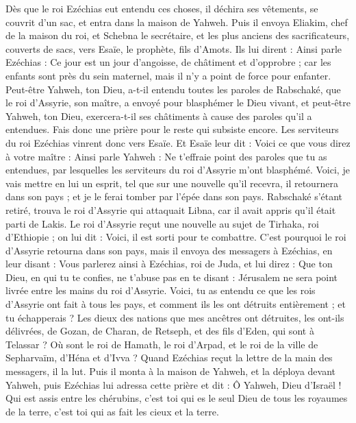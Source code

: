\begin{multicols}{2}
\VerseOne{}Dès que le roi Ezéchias eut entendu ces choses, il déchira ses vêtements, se couvrit d’un sac, et entra dans la maison de Yahweh.
Puis il envoya Eliakim, chef de la maison du roi, et Schebna le secrétaire, et les plus anciens des sacrificateurs, couverts de sacs, vers Esaïe, le prophète, fils d’Amots.
Ils lui dirent : Ainsi parle Ezéchias : Ce jour est un jour d’angoisse, de châtiment et d’opprobre ; car les enfants sont près du sein maternel, mais il n’y a point de force pour enfanter.
Peut-être Yahweh, ton Dieu, a-t-il entendu toutes les paroles de Rabschaké, que le roi d’Assyrie, son maître, a envoyé pour blasphémer le Dieu vivant, et peut-être Yahweh, ton Dieu, exercera-t-il ses châtiments à cause des paroles qu’il a entendues. Fais donc une prière pour le reste qui subsiste encore.
Les serviteurs du roi Ezéchias vinrent donc vers Esaïe.
Et Esaïe leur dit : Voici ce que vous direz à votre maître : Ainsi parle Yahweh : Ne t’effraie point des paroles que tu as entendues, par lesquelles les serviteurs du roi d’Assyrie m’ont blasphémé.
Voici, je vais mettre en lui un esprit, tel que sur une nouvelle qu’il recevra, il retournera dans son pays ; et je le ferai tomber par l’épée dans son pays.
Rabschaké s’étant retiré, trouva le roi d’Assyrie qui attaquait Libna, car il avait appris qu’il était parti de Lakis.
Le roi d’Assyrie reçut une nouvelle au sujet de Tirhaka, roi d’Ethiopie ; on lui dit : Voici, il est sorti pour te combattre. C’est pourquoi le roi d’Assyrie retourna dans son pays, mais il envoya des messagers à Ezéchias, en leur disant :
Vous parlerez ainsi à Ezéchias, roi de Juda, et lui direz : Que ton Dieu, en qui tu te confies, ne t’abuse pas en te disant : Jérusalem ne sera point livrée entre les mains du roi d’Assyrie.
Voici, tu as entendu ce que les rois d’Assyrie ont fait à tous les pays, et comment ils les ont détruits entièrement ; et tu échapperais ?
Les dieux des nations que mes ancêtres ont détruites, les ont-ils délivrées, de Gozan, de Charan, de Retseph, et des fils d’Eden, qui sont à Telassar ?
Où sont le roi de Hamath, le roi d’Arpad, et le roi de la ville de Sepharvaïm, d’Héna et d’Ivva ?
Quand Ezéchias reçut la lettre de la main des messagers, il la lut. Puis il monta à la maison de Yahweh, et la déploya devant Yahweh,
puis Ezéchias lui adressa cette prière et dit : Ô Yahweh, Dieu d’Israël ! Qui est assis entre les chérubins, c’est toi qui es le seul Dieu de tous les royaumes de la terre, c’est toi qui as fait les cieux et la terre.

\end{multicols}
